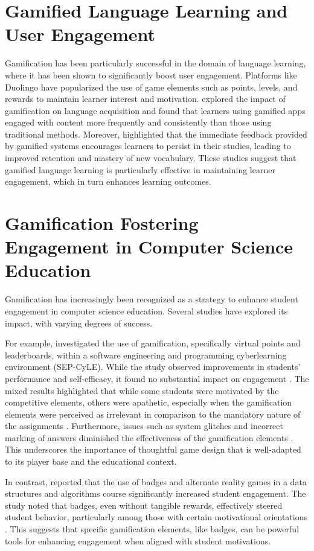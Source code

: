 \documentclass[sigconf,review]{acmart} %
\begin{document}
\section{Gamified Language Learning and User Engagement}
Gamification has been particularly successful in the domain of language learning, where it has been shown to significantly boost user engagement. Platforms like Duolingo have popularized the use of game elements such as points, levels, and rewards to maintain learner interest and motivation. \citet{article3} explored the impact of gamification on language acquisition and found that learners using gamified apps engaged with content more frequently and consistently than those using traditional methods. Moreover, \citet{article4} highlighted that the immediate feedback provided by gamified systems encourages learners to persist in their studies, leading to improved retention and mastery of new vocabulary. These studies suggest that gamified language learning is particularly effective in maintaining learner engagement, which in turn enhances learning outcomes.

\section{Gamification Fostering Engagement in Computer Science Education}
Gamification has increasingly been recognized as a strategy to enhance student engagement in computer science education. Several studies have explored its impact, with varying degrees of success.

For example, \citet{Zahedi2021} investigated the use of gamification, specifically virtual points and leaderboards, within a software engineering and programming cyberlearning environment (SEP-CyLE). While the study observed improvements in students' performance and self-efficacy, it found no substantial impact on engagement \cite{Zahedi2021}. The mixed results highlighted that while some students were motivated by the competitive elements, others were apathetic, especially when the gamification elements were perceived as irrelevant in comparison to the mandatory nature of the assignments \cite{Zahedi2021}. Furthermore, issues such as system glitches and incorrect marking of answers diminished the effectiveness of the gamification elements \cite{Zahedi2021}. This underscores the importance of thoughtful game design that is well-adapted to its player base and the educational context.

In contrast, \citet{Hakulinen2021} reported that the use of badges and alternate reality games in a data structures and algorithms course significantly increased student engagement. The study noted that badges, even without tangible rewards, effectively steered student behavior, particularly among those with certain motivational orientations \cite{Hakulinen2021}. This suggests that specific gamification elements, like badges, can be powerful tools for enhancing engagement when aligned with student motivations.
\end{document}
